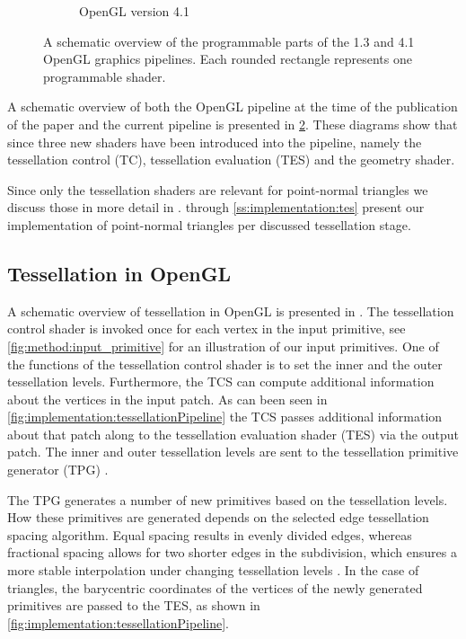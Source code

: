 \begin{figure}
\begin{subfigure}[b]{0.4\columnwidth}
			\caption{OpenGL version 4.1}
			\label{fig:implementation:pipeline:new}
		\end{subfigure}	
		\caption{A schematic overview of the programmable parts of the  1.3 and  4.1 OpenGL graphics pipelines. Each rounded rectangle represents one programmable shader.}
		\label{fig:implementation:pipeline}
	\end{figure}

	A schematic overview of both the OpenGL pipeline at the time of the publication of the paper and the current pipeline is presented in \cref{fig:implementation:pipeline}. These diagrams show that since \citeyear{vlachos2001curved} three new shaders have been introduced into the pipeline, namely the tessellation control (TC), tessellation evaluation (TES) and the geometry shader. 

	Since only the tessellation shaders are relevant for point-normal triangles we discuss those in more detail in .  through \ref{ss:implementation:tes} present our implementation of point-normal triangles per discussed tessellation stage. 

\subsection{Tessellation in OpenGL}
\label{ss:implementation:pipeline}

	A schematic overview of tessellation in OpenGL is presented in .
	The tessellation control shader is invoked once for each vertex in the input primitive, see \cref{fig:method:input_primitive} for an illustration of our input primitives.
	One of the functions of the tessellation control shader is to set the inner and the outer tessellation levels. Furthermore, the TCS can compute additional information about the vertices in the input patch. 
	As can been seen in \cref{fig:implementation:tessellationPipeline} the TCS passes additional information about that patch along to the tessellation evaluation shader (TES) via the output patch. The inner and outer tessellation levels are sent to the tessellation primitive generator (TPG) \cite{wolff2013opengl}.

	The TPG generates a number of new primitives based on the tessellation levels. How these primitives are generated depends on the selected edge tessellation spacing algorithm. Equal spacing results in evenly divided edges, whereas fractional spacing allows for two shorter edges in the subdivision, which ensures a more stable interpolation under changing tessellation levels \cite{wolff2013opengl,openGL41Core}. In the case of triangles, the barycentric coordinates of the vertices of the newly generated primitives are passed to the TES, as shown in \cref{fig:implementation:tessellationPipeline}.


